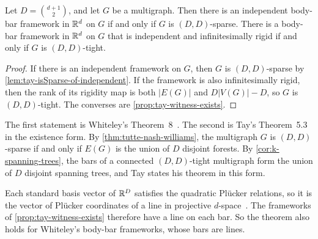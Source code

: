 \begin{theorem}
  \label{thm:tay-witness}
  \leanok
  Let $D = \binom{d+1}{2}$, and let $G$ be a multigraph. Then there is
  an independent body-bar framework in ${\mathbb{R}}^d$ on $G$ if and only if
  $G$ is $(D, D)$-sparse. There is a body-bar framework in ${\mathbb{R}}^d$ on
  $G$ that is independent and infinitesimally rigid if and only if $G$
  is $(D, D)$-tight.
\end{theorem}
\begin{proof}
  \leanok
  If there is an independent framework on $G$, then $G$ is
  $(D, D)$-sparse by \cref{lem:tay-isSparse-of-independent}. If the
  framework is also infinitesimally rigid, then the rank of its rigidity
  map is both $|E(G)|$ and $D|V(G)| - D$, so $G$ is $(D, D)$-tight. The
  converses are \cref{prop:tay-witness-exists}.
\end{proof}

The first statement is Whiteley's Theorem~8~\cite{whiteley1988}. The
second is Tay's Theorem~5.3~\cite{tay1984} in the existence form. By
\cref{thm:tutte-nash-williams}, the multigraph $G$ is $(D, D)$-sparse if
and only if $E(G)$ is the union of $D$ disjoint forests. By
\cref{cor:k-spanning-trees}, the bars of a connected $(D, D)$-tight
multigraph form the union of $D$ disjoint spanning trees, and Tay
states his theorem in this form.

Each standard basis vector of ${\mathbb{R}}^D$ satisfies the quadratic Pl\"ucker
relations, so it is the vector of Pl\"ucker coordinates of a line in
projective $d$-space~\cite[proof of Theorem~8]{whiteley1988}. The
frameworks of \cref{prop:tay-witness-exists} therefore have a line on
each bar. So the theorem also holds for Whiteley's body-bar frameworks,
whose bars are lines.
